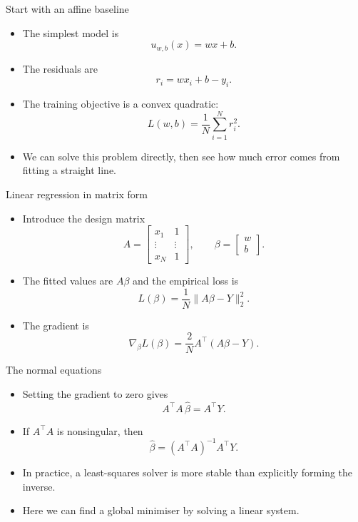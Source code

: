 \documentclass[aspectratio=43,11pt]{beamer}
\newcommand{\slideid}{L2}
\newenvironment{slideitems}{\small\begin{itemize}\setlength\itemsep{0.45em}}{\end{itemize}}
\begin{document}
\renewcommand{\slideid}{L2-S10}
\begin{frame}[t]{Start with an affine baseline}
\begin{slideitems}
\item The simplest model is
\[
u_{w,b}(x)=wx+b.
\]
\item The residuals are
\[
r_i=wx_i+b-y_i.
\]
\item The training objective is a convex quadratic:
\[
L(w,b)=\frac1N\sum_{i=1}^N r_i^2.
\]
\item We can solve this problem directly, then see how much error comes from fitting a straight line.
\end{slideitems}
\end{frame}

\renewcommand{\slideid}{L2-S11}
\begin{frame}[t]{Linear regression in matrix form}
\begin{slideitems}
\item Introduce the design matrix
\[
A=\begin{bmatrix}x_1&1\\ \vdots&\vdots\\ x_N&1\end{bmatrix},\qquad \beta=\begin{bmatrix}w\\b\end{bmatrix}.
\]
\item The fitted values are $A\beta$ and the empirical loss is
\[
L(\beta)=\frac1N\|A\beta-Y\|_2^2.
\]
\item The gradient is
\[
\nabla_\beta L(\beta)=\frac{2}{N}A^\top(A\beta-Y).
\]
\end{slideitems}
\end{frame}

\renewcommand{\slideid}{L2-S12}
\begin{frame}[t]{The normal equations}
\begin{slideitems}
\item Setting the gradient to zero gives
\[
A^\top A\,\widehat\beta=A^\top Y.
\]
\item If $A^\top A$ is nonsingular, then
\[
\widehat\beta=(A^\top A)^{-1}A^\top Y.
\]
\item In practice, a least-squares solver is more stable than explicitly forming the inverse.
\item Here we can find a global minimiser by solving a linear system.
\end{slideitems}
\end{frame}
\end{document}
